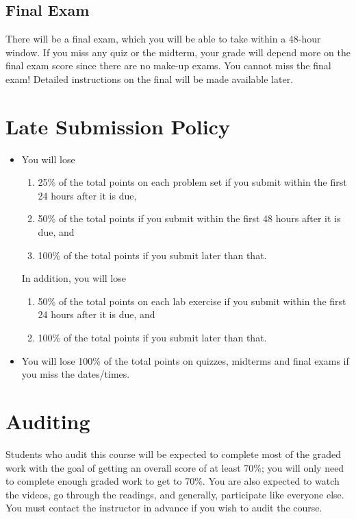 \documentclass[11pt, a4paper]{article}
\begin{document}
\subsection{Final Exam}
There will be a final exam, which you will be able to take within a 48-hour window. If you miss any quiz or the midterm, your grade will depend more on the final exam score since there are no make-up exams. You cannot miss the final exam! Detailed instructions on the final will be made available later.


\section{Late Submission Policy} 
\begin{itemize}
	\item You will lose
	\begin{enumerate}
		\item 25\% of the total points on each problem set if you submit within the first 24 hours after it is due, 
		\item 50\% of the total points if you submit within the first 48 hours after it is due, and
		\item 100\% of the total points if you submit later than that.
	\end{enumerate}
	
	In addition, you will lose 
	\begin{enumerate}
		\item 50\% of the total points on each lab exercise if you submit within the first 24 hours after it is due, and
		\item 100\% of the total points if you submit later than that.
	\end{enumerate}
	
	\item You will lose 100\% of the total points on quizzes, midterms and final exams if you miss the dates/times.
\end{itemize}


\section{Auditing}
Students who audit this course will be expected to complete most of the graded work with the goal of getting an overall score of at least 70\%; you will only need to complete enough graded work to get to 70\%. You are also expected to watch the videos, go through the readings, and generally, participate like everyone else. You must contact the instructor in advance if you wish to audit the course.
\end{document}
